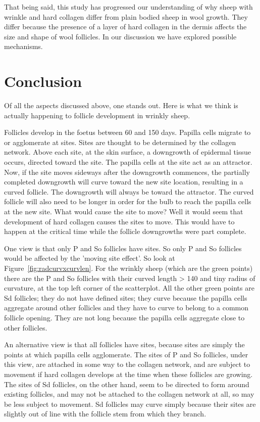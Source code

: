 \documentclass[titlepage]{article}  %
\begin{document}
That being said, this study has progressed our understanding of why sheep with wrinkle and hard collagen differ from plain bodied sheep in wool growth. They differ because the presence of a layer of hard collagen in the dermis affects the size and shape of wool follicles. In our discussion we have explored possible mechanisms.

\section{Conclusion}
Of all the aspects discussed above, one stands out. Here is what we think is actually happening to follicle development in wrinkly sheep.

Follicles develop in the foetus between 60 and 150 days. Papilla cells migrate to  or agglomerate at sites. Sites are thought to be determined by the collagen network. Above each site, at the skin surface, a downgrowth of epidermal tissue occurs, directed toward the site. The papilla cells at the site act as an attractor.  Now, if the site moves sideways after the downgrowth commences, the partially completed downgrowth will curve toward the new site location, resulting in a curved follicle. The downgrowth will always be toward the attractor. The curved follicle will also need to be longer in order for the bulb to reach the papilla cells at the new site. What would cause the site to move? Well  it would seem that development of hard collagen causes the sites to move. This would have to happen at the critical time while the follicle downgrowths were part complete.

One view is that only P and So follicles have sites. So only P and So follicles would be affected by the 'moving site effect'. So look at Figure~\ref{fig:radcurvxcurvlen}. For the wrinkly sheep  (which are the green points) there are the P and So follicles with their curved length > 140 and tiny radius of curvature, at the top left corner of the scatterplot. All the other green points are Sd follicles; they do not have defined sites; they curve because the papilla cells aggregate around other follicles and they have to curve to belong to a common follicle opening. They are not long because the papilla cells aggregate close to other follicles.

An alternative view is that all follicles have sites, because sites are simply the points at which papilla cells agglomerate. The sites of P and So follicles, under this view, are attached in some way to the collagen network, and are subject to movement if hard collagen develops at the time when these follicles are growing. The sites of Sd follicles, on the other hand, seem to be directed to form around existing follicles, and may not be attached to the collagen network at all, so may be less subject to movement. Sd follicles may curve simply because their sites are  slightly out of line with the follicle stem from which they branch.
\end{document}
